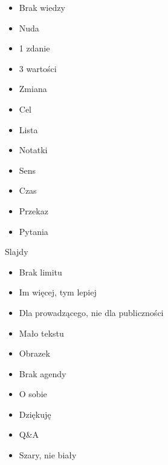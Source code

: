 \documentclass{beamer}
\begin{document}
\begin{frame}{}
	\begin{Large}
		\begin{itemize}
			\item Brak wiedzy
			\item Nuda
			\item 1 zdanie
			\item 3 wartości
			\item Zmiana
			\item Cel
		\end{itemize}
	\end{Large}
\end{frame}

\begin{frame}{}
	\begin{Large}
		\begin{itemize}
			\item Lista
			\item Notatki
			\item Sens
			\item Czas
			\item Przekaz
			\item Pytania
		\end{itemize}
	\end{Large}
\end{frame}

\begin{frame}{}
	\begin{center}
		\Huge{Slajdy}
	\end{center}
\end{frame}

\begin{frame}{}
	\begin{Large}
		\begin{itemize}
			\item Brak limitu
			\item Im więcej, tym lepiej
			\item Dla prowadzącego, nie dla publiczności
			\item Mało tekstu
			\item Obrazek
			\item Brak agendy
			\item O sobie
			\item Dziękuję
			\item Q\&A
			\item Szary, nie biały
		\end{itemize}
	\end{Large}
\end{frame}
\end{document}
